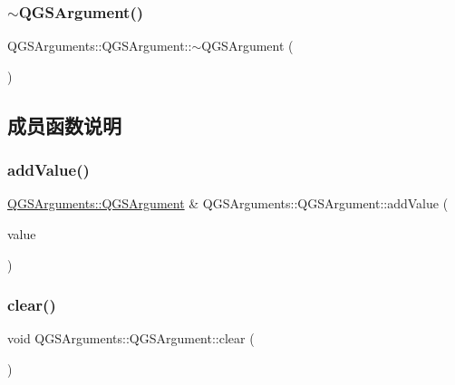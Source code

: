 \subsubsection{\texorpdfstring{$\sim$\+Q\+G\+S\+Argument()}{~QGSArgument()}}
{\footnotesize\ttfamily Q\+G\+S\+Arguments\+::\+Q\+G\+S\+Argument\+::$\sim$\+Q\+G\+S\+Argument (\begin{DoxyParamCaption}{ }\end{DoxyParamCaption})}



\subsection{成员函数说明}
\mbox{\label{class_q_g_s_arguments_1_1_q_g_s_argument_a1e1535ff6cb2179528ce1e38bfa72a04}} 
\subsubsection{\texorpdfstring{add\+Value()}{addValue()}}
{\footnotesize\ttfamily \mbox{\hyperlink{class_q_g_s_arguments_1_1_q_g_s_argument}{Q\+G\+S\+Arguments\+::\+Q\+G\+S\+Argument}} \& Q\+G\+S\+Arguments\+::\+Q\+G\+S\+Argument\+::add\+Value (\begin{DoxyParamCaption}\item[{const Q\+String \&}]{value }\end{DoxyParamCaption})}

\mbox{\label{class_q_g_s_arguments_1_1_q_g_s_argument_af86b7e84c97fbce61657bd82b73226fc}} 
\subsubsection{\texorpdfstring{clear()}{clear()}}
{\footnotesize\ttfamily void Q\+G\+S\+Arguments\+::\+Q\+G\+S\+Argument\+::clear (\begin{DoxyParamCaption}{ }\end{DoxyParamCaption})}

